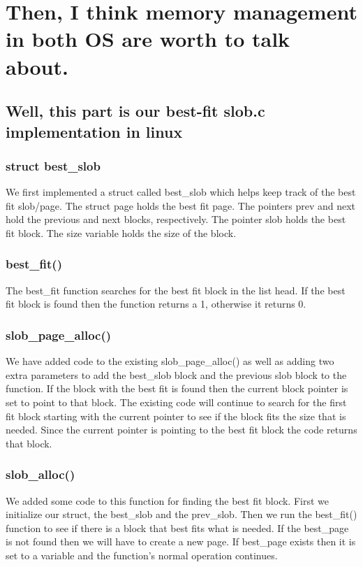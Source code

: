 \documentclass[12pt,letterpaper]{article}
\begin{document}
\section{Then, I think memory management in both OS are worth to talk about.}
\subsection{Well, this part is our best-fit slob.c implementation in linux}
\subsubsection{struct best\_slob}
We first implemented a struct called best\_slob which helps keep track of the best fit slob/page. The struct page holds the best fit page. The pointers prev and next hold the previous and next blocks, respectively. The pointer slob holds the best fit block. The size variable holds the size of the block.
\subsubsection{best\_fit()}
The best\_fit function searches for the best fit block in the list head. If the best fit block is found then the function returns a 1, otherwise it returns 0.
\subsubsection{slob\_page\_alloc()}
We have added code to the existing slob\_page\_alloc() as well as adding two extra parameters to add the best\_slob block and the previous slob block to the function. If the block with the best fit is found then the current block pointer is set to point to that block. The existing code will continue to search for the first fit block starting with the current pointer to see if the block fits the size that is needed. Since the current pointer is pointing to the best fit block the code returns that block. 
\subsubsection{slob\_alloc()}
We added some code to this function for finding the best fit block. First we initialize our struct, the best\_slob and the prev\_slob. Then we run the best\_fit() function to see if there is a block that best fits what is needed. If the best\_page is not found then we will have to create a new page. If best\_page exists then it is set to a variable and the function's normal operation continues.
\end{document}
